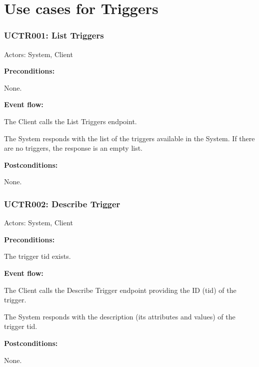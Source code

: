 \section{Use cases for Triggers}

\begin{ucbox}{\subsubsection{UCTR001: List Triggers}}
\label{UCTR001}

Actors: System, Client

\textbf{Preconditions:}

\ucitem None.

\textbf{Event flow:}

\ucitem The Client calls the List Triggers endpoint.

\ucitem The System responds with the list of the triggers available in the System. If there are no triggers, the response is an empty list.

\textbf{Postconditions:}

\ucitem None.

\end{ucbox}

\begin{ucbox}{\subsubsection{UCTR002: Describe Trigger}}
\label{UCTR002}

Actors: System, Client

\textbf{Preconditions:}

\ucitem The trigger tid exists.

\textbf{Event flow:}

\ucitem The Client calls the Describe Trigger endpoint providing the ID (tid) of the trigger.

\ucitem The System responds with the description (its attributes and values) of the trigger tid.

\textbf{Postconditions:}

\ucitem None.

\end{ucbox}

